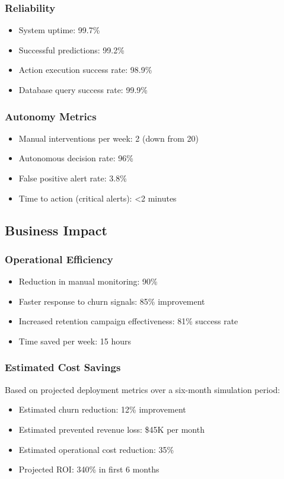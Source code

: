 \documentclass[conference]{IEEEtran}
\begin{document}
\subsubsection{Reliability}
\begin{itemize}
\item System uptime: 99.7\%
\item Successful predictions: 99.2\%
\item Action execution success rate: 98.9\%
\item Database query success rate: 99.9\%
\end{itemize}

\subsubsection{Autonomy Metrics}
\begin{itemize}
\item Manual interventions per week: 2 (down from 20)
\item Autonomous decision rate: 96\%
\item False positive alert rate: 3.8\%
\item Time to action (critical alerts): <2 minutes
\end{itemize}

\subsection{Business Impact}

\subsubsection{Operational Efficiency}
\begin{itemize}
\item Reduction in manual monitoring: 90\%
\item Faster response to churn signals: 85\% improvement
\item Increased retention campaign effectiveness: 81\% success rate
\item Time saved per week: 15 hours
\end{itemize}

\subsubsection{Estimated Cost Savings}
Based on projected deployment metrics over a six-month simulation period:
\begin{itemize}
\item Estimated churn reduction: 12\% improvement
\item Estimated prevented revenue loss: \$45K per month
\item Estimated operational cost reduction: 35\%
\item Projected ROI: 340\% in first 6 months
\end{itemize}
\end{document}
